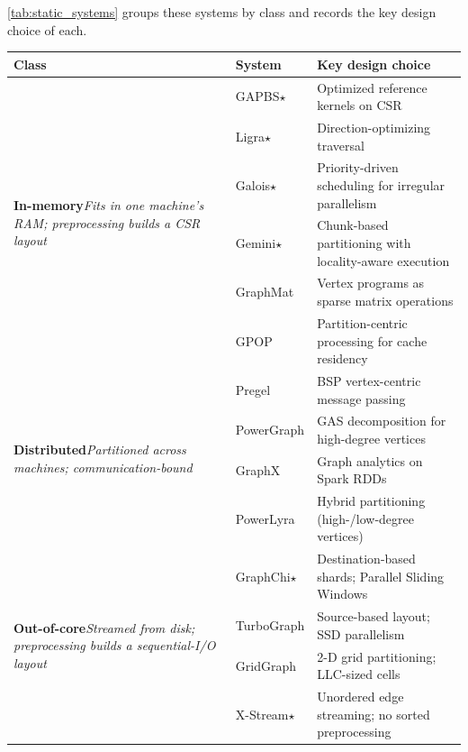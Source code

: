 \autoref{tab:static_systems} groups these systems by class and records the key design choice of each.

\newcommand{\evalstar}{{\color[RGB]{219,16,72}$\star$}}
  \begin{table}[t]
  \centering
  \small
  \begin{tabular}{@{}p{3.7cm}ll@{}}
  \toprule
  \textbf{Class} & \textbf{System} & \textbf{Key design choice} \\
  \midrule
  \multirow{6}{=}{\textbf{In-memory}\newline\footnotesize\emph{Fits in one machine's RAM; preprocessing builds a CSR layout}}
      & GAPBS\evalstar{}   & Optimized reference kernels on CSR \\
      & Ligra\evalstar{}   & Direction-optimizing traversal \\
      & Galois\evalstar{}  & Priority-driven scheduling for irregular parallelism \\
      & Gemini\evalstar{}  & Chunk-based partitioning with locality-aware execution \\
      & GraphMat           & Vertex programs as sparse matrix operations \\
      & GPOP               & Partition-centric processing for cache residency \\
  \midrule
  \multirow{4}{=}{\textbf{Distributed}\newline\footnotesize\emph{Partitioned across machines; communication-bound}}
      & Pregel             & BSP vertex-centric message passing \\
      & PowerGraph         & GAS decomposition for high-degree vertices \\
      & GraphX             & Graph analytics on Spark RDDs \\
      & PowerLyra          & Hybrid partitioning (high-/low-degree vertices) \\
  \midrule
  \multirow{7}{=}{\textbf{Out-of-core}\newline\footnotesize\emph{Streamed from disk; preprocessing builds a sequential-I/O layout}}
      & GraphChi\evalstar{}& Destination-based shards; Parallel Sliding Windows \\
      & TurboGraph         & Source-based layout; SSD parallelism \\
      & GridGraph          & 2-D grid partitioning; LLC-sized cells \\
      & X-Stream\evalstar{}& Unordered edge streaming; no sorted preprocessing \\

\end{tabular}
\end{table}
